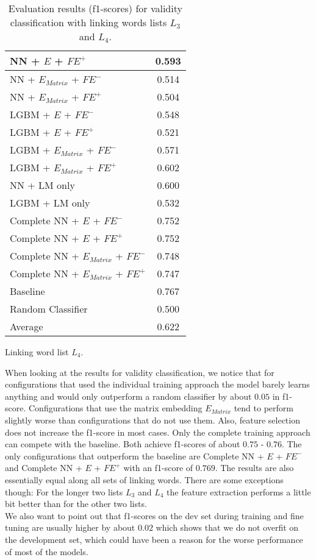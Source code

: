 \begin{table}[h]
\begin{subtable}{.5\textwidth}
\begin{tabular}{|| l || c ||}
 			NN + $E$ + $\textit{FE}^+$ & 0.593 \\
 			\hline
 			NN + $E_{Matrix}$ + $\textit{FE}^-$ & 0.514 \\
 			\hline
 			NN + $E_{Matrix}$ + $\textit{FE}^+$ & 0.504 \\
 			\hline
 			LGBM + $E$ + $\textit{FE}^-$ & 0.548 \\
 			\hline
 			LGBM + $E$ + $\textit{FE}^+$ & 0.521 \\
 			\hline
 			LGBM + $E_{Matrix}$ + $\textit{FE}^-$ & 0.571 \\
 			\hline
 			LGBM + $E_{Matrix}$ + $\textit{FE}^+$ & 0.602 \\
 			\hline
 			NN + LM only & 0.600 \\
 			\hline
 			LGBM + LM only & 0.532 \\
 			\hline
 			Complete NN + $E$ + $\textit{FE}^-$ & 0.752 \\
 			\hline
 			Complete NN + $E$ + $\textit{FE}^+$ & 0.752 \\
 			\hline
 			Complete NN + $E_{Matrix}$ + $\textit{FE}^-$ & 0.748 \\
 			\hline
 			Complete NN + $E_{Matrix}$ + $\textit{FE}^+$ & 0.747 \\
 			\hline
 			Baseline & 0.767 \\
 			\hline
 			Random Classifier & 0.500 \\
 			\hline
 			\hline
 			Average & 0.622 \\
 			\hline
		\end{tabular}
		\renewcommand{\arraystretch}{1}
  		\caption{Linking word list $L_4$.}%
  	\end{subtable}
  	\caption{Evaluation results (f1-scores) for validity classification with linking words lists $L_3$ and $L_4$.}%
  	\label{fig:validityresults2}
\end{table}

When looking at the results for validity classification, we notice that for configurations that used the individual training approach the model barely learns anything and would only outperform a random classifier by about $0.05$ in f1-score. Configurations that use the matrix embedding $E_{Matrix}$ tend to perform slightly worse than configurations that do not use them. Also, feature selection does not increase the f1-score in most cases. Only the complete training approach can compete with the baseline. Both achieve f1-scores of about $0.75$ - $0.76$. The only configurations that outperform the baseline are 
Complete NN + $E$ + $\textit{FE}^-$ and Complete NN + $E$ + $\textit{FE}^+$ with an f1-score of $0.769$. The results are also essentially equal along all sets of linking words. There are some exceptions though: For the longer two lists $L_3$ and $L_4$ the feature extraction performs a little bit better than for the other two lists. \\
We also want to point out that f1-scores on the dev set during training and fine tuning are usually higher by about $0.02$ which shows that we do not overfit on the development set, which could have been a reason for the worse performance of most of the models.

